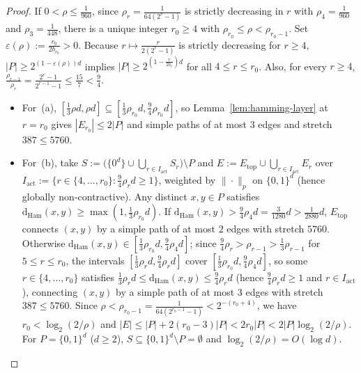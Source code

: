 \documentclass[11pt]{article}
\theoremstyle{definition}
\theoremstyle{remark}
\newcommand{\Ham}{\mathrm{Ham}}
\newcommand{\dHam}{\mathrm{d}_{\Ham}}
\begin{document}
\begin{proof}
If $0 < \rho \le \frac{1}{960}$, since $\rho_r = \frac{1}{64(2^r - 1)}$ is strictly decreasing in $r$ with $\rho_4 = \frac{1}{960}$ and $\rho_3 = \frac{1}{448}$, there is a unique integer $r_0 \ge 4$ with $\rho_{r_0} \le \rho < \rho_{r_0 - 1}$. Set $\varepsilon(\rho) := \frac{r_0}{2 b_{r_0}} > 0$. Because $r \mapsto \frac{r}{2(2^r - 1)}$ is strictly decreasing for $r \ge 4$, $|P| \ge 2^{(1 - \varepsilon(\rho)) d}$ implies $|P| \ge 2^{(1 - \frac{r}{2 b_r}) d}$ for all $4 \le r \le r_0$. Also, for every $r \ge 4$, $\frac{\rho_{r-1}}{\rho_r} = \frac{2^r - 1}{2^{r-1} - 1} \le \frac{15}{7} < \frac{9}{4}$.
\begin{itemize}[leftmargin=2em,nosep]
  \item For~(a), $[\frac{1}{3}\rho d, \rho d] \subseteq [\frac{1}{3}\rho_{r_0} d, \frac{9}{4}\rho_{r_0} d]$, so Lemma~\ref{lem:hamming-layer} at $r = r_0$ gives $|E_{r_0}| \le 2|P|$ and simple paths of at most $3$ edges and stretch $387 \le 5760$.
  \item For~(b), take $S := \bigl(\{0^d\} \cup \bigcup_{r \in I_{\mathrm{act}}} S_r\bigr) \setminus P$ and $E := E_{\mathrm{top}} \cup \bigcup_{r \in I_{\mathrm{act}}} E_r$ over $I_{\mathrm{act}} := \{r \in \{4, \dots, r_0\} : \frac{9}{4}\rho_r d \ge 1\}$, weighted by $\|\cdot\|_p$ on $\{0, 1\}^d$ (hence globally non-contractive). Any distinct $x, y \in P$ satisfies $\dHam(x, y) \ge \max(1, \frac{1}{3}\rho_{r_0} d)$. If $\dHam(x, y) > \frac{9}{4}\rho_4 d = \frac{3}{1280} d > \frac{1}{2880} d$, $E_{\mathrm{top}}$ connects $(x, y)$ by a simple path of at most $2$ edges with stretch $5760$. Otherwise $\dHam(x, y) \in [\frac{1}{3}\rho_{r_0} d, \frac{9}{4}\rho_4 d]$; since $\frac{9}{4}\rho_r > \rho_{r-1} > \frac{1}{3}\rho_{r-1}$ for $5 \le r \le r_0$, the intervals $[\frac{1}{3}\rho_r d, \frac{9}{4}\rho_r d]$ cover $[\frac{1}{3}\rho_{r_0} d, \frac{9}{4}\rho_4 d]$, so some $r \in \{4, \dots, r_0\}$ satisfies $\frac{1}{3}\rho_r d \le \dHam(x, y) \le \frac{9}{4}\rho_r d$ (hence $\frac{9}{4}\rho_r d \ge 1$ and $r \in I_{\mathrm{act}}$), connecting $(x, y)$ by a simple path of at most $3$ edges with stretch $387 \le 5760$. Since $\rho < \rho_{r_0 - 1} = \frac{1}{64(2^{r_0 - 1} - 1)} < 2^{-(r_0 + 4)}$, we have $r_0 < \log_2(2/\rho)$ and $|E| \le |P| + 2(r_0 - 3)|P| < 2 r_0 |P| < 2|P|\log_2(2/\rho)$. For $P = \{0, 1\}^d$ ($d \ge 2$), $S \subseteq \{0, 1\}^d \setminus P = \emptyset$ and $\log_2(2/\rho) = O(\log d)$. \qedhere
\end{itemize}
\end{proof}


\end{document}
